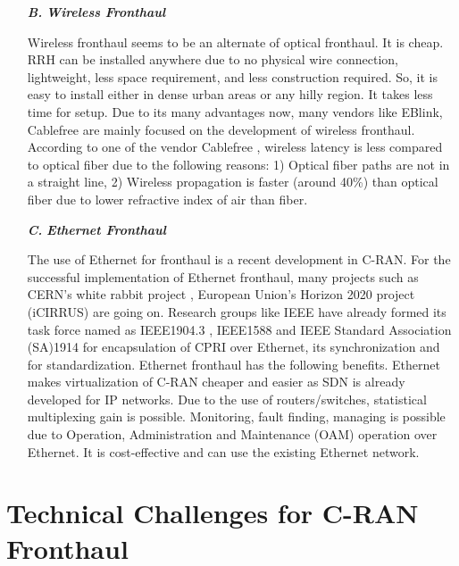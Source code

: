 \begin{multicols}{2}

\begin{itemize}



\item[{\textit{\textbf{ B.}}}] {\textit{\textbf{Wireless Fronthaul}}}

Wireless fronthaul seems to be an alternate of optical fronthaul. It is cheap. RRH can be \hbox{installed} anywhere due to no physical wire connection, lightweight, less space requirement, and less construction required. So, it is easy to install either in dense urban areas or any hilly region. It takes less time for setup. Due to its many advantages now, many vendors like EBlink, Cablefree are mainly focused on the development of wireless fronthaul. According to one of the vendor Cablefree \cite{art3-key42}, wireless latency is less compared to optical fiber due to the following reasons: 1) Optical fiber paths are not in a straight line, 2) Wireless propagation is faster (around 40\%) than optical fiber due to lower refractive index of air than fiber.

\item[{\textit{\textbf{ C.}}}] {\textit{\textbf{Ethernet Fronthaul}}}

The use of Ethernet for fronthaul is a recent development in C-RAN. For the successful implementation of Ethernet fronthaul, many projects such as CERN’s white rabbit project \cite{art3-key44}, European Union’s Horizon 2020 project (iCIRRUS) \cite{art3-key45} are going on. Research groups like IEEE have already formed its task force named as IEEE1904.3 \cite{art3-key46}, IEEE1588 \cite{art3-key47} and IEEE Standard Association (SA)1914 \cite{art3-key48} for encapsulation of CPRI over Ethernet, its synchronization and for standardization. Ethernet fronthaul has the following benefits. Ethernet makes virtualization of C-RAN cheaper and easier as SDN is already developed for IP networks. Due to the use of routers/switches, statistical multiplexing gain is possible. Monitoring, fault finding, managing is possible due to Operation, Administration and Maintenance (OAM) operation over Ethernet. It is cost-effective and can use the existing Ethernet network.
\end{itemize}

\section{Technical Challenges for C-RAN Fronthaul}\label{sect05}


\end{multicols}
